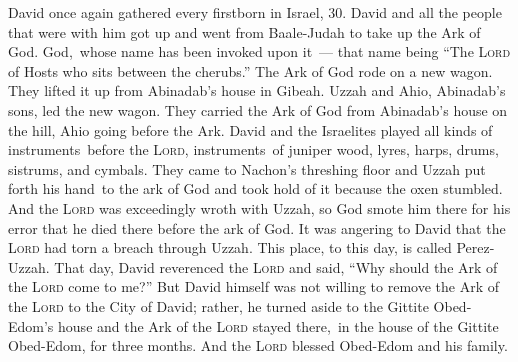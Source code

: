 
\begin{inparaenum}
   David once again gathered every firstborn in Israel, 30.%
   David and all the people that were with him got up and went from Baale-Judah to take up the Ark of God. God,\understood\ whose name has been invoked upon it~--- that name being ``The \textsc{Lord} of Hosts who sits between the cherubs.''%
   The Ark of God rode on a new wagon. They lifted it up from Abinadab's house in Gibeah. Uzzah and Ahio, Abinadab's sons, led the new wagon.%
   They carried the Ark of God from Abinadab's house on the hill, Ahio going before the Ark.%
   David and the Israelites played all kinds of instruments\understood\ before the \textsc{Lord}, instruments\understood\ of juniper wood, lyres, harps, drums, sistrums, and cymbals.%
   They came to Nachon's threshing floor and Uzzah put forth his hand\understood\ to the ark of God and took hold of it because the oxen stumbled.%
   And the \textsc{Lord} was exceedingly wroth with Uzzah, so God smote him there for his error that he died there before the ark of God.%
   It was angering to David that the \textsc{Lord} had torn a breach through Uzzah. This place, to this day, is called Perez-Uzzah.%
   That day, David reverenced the \textsc{Lord} and said, ``Why should the Ark of the \textsc{Lord} come to me?''%
   But David himself was not willing to remove the Ark of the \textsc{Lord} to the City of David; rather, he turned aside to the Gittite Obed-Edom's house%
   and the Ark of the \textsc{Lord} stayed there,\understood\ in the house of the Gittite Obed-Edom, for three months. And the \textsc{Lord} blessed Obed-Edom and his family.%

\end{inparaenum}
